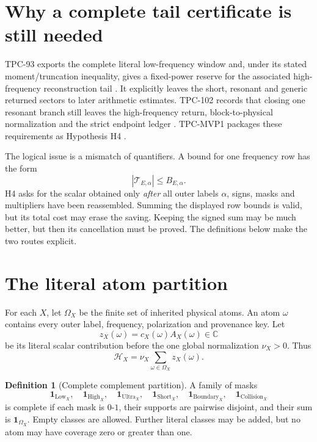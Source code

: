 \documentclass[11pt]{article}
\theoremstyle{definition}
\newtheorem{definition}[theorem]{Definition}
\theoremstyle{remark}
\newcommand{\C}{\mathbb C}
\newcommand{\one}{\mathbf 1}
\newcommand{\Tail}{\mathcal T}
\newcommand{\Low}{\mathrm{Low}}
\newcommand{\High}{\mathrm{High}}
\newcommand{\Ultra}{\mathrm{Ultra}}
\newcommand{\Short}{\mathrm{Short}}
\newcommand{\Boundary}{\mathrm{Boundary}}
\newcommand{\Collision}{\mathrm{Collision}}
\begin{document}
\section{Why a complete tail certificate is still needed}

TPC-93 exports the complete literal low-frequency window and, under
its stated moment/truncation inequality, gives a fixed-power reserve
for the associated high-frequency reconstruction tail
\citep{WangTPC93}.  It explicitly leaves the short, resonant and
generic returned sectors to later arithmetic estimates.  TPC-102
records that closing one resonant branch still leaves the
high-frequency return, block-to-physical normalization and the
strict endpoint ledger \citep{WangTPC102}.  TPC-MVP1 packages these
requirements as Hypothesis H4 \citep{WangMVP1}.

The logical issue is a mismatch of quantifiers.  A bound for one
frequency row has the form
\[
 |\Tail_{E,\alpha}|\le B_{E,\alpha}.
\]
H4 asks for the scalar obtained only \emph{after} all outer labels
\(\alpha\), signs, masks and multipliers have been reassembled.
Summing the displayed row bounds is valid, but its total cost may
erase the saving.  Keeping the signed sum may be much better, but
then its cancellation must be proved.  The definitions below make
the two routes explicit.

\section{The literal atom partition}

For each \(X\), let \(\Omega_X\) be the finite set of inherited
physical atoms.  An atom \(\omega\) contains every outer label,
frequency, polarization and provenance key.  Let
\[
 z_X(\omega)=c_X(\omega)A_X(\omega)\in\C
\]
be its literal scalar contribution before the one global
normalization \(\nu_X>0\).  Thus
\[
 \mathcal H_X=\nu_X\sum_{\omega\in\Omega_X}z_X(\omega).
\]

\begin{definition}[Complete complement partition]
\label{def:partition}
A family of masks
\[
 \one_{\Low_X},\quad
 \one_{\High_X},\quad
 \one_{\Ultra_X},\quad
 \one_{\Short_X},\quad
 \one_{\Boundary_X},\quad
 \one_{\Collision_X}
\]
is complete if each mask is \(0\)-\(1\), their supports are pairwise
disjoint, and their sum is \(\one_{\Omega_X}\).  Empty classes are
allowed.  Further literal classes may be added, but no atom may have
coverage zero or greater than one.
\end{definition}
\end{document}
